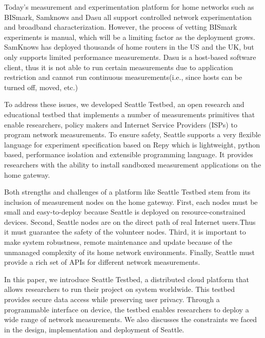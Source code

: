 \documentclass[11pt, oneside]{article}   	%
\begin{document}
Today's measurement and experimentation platform for home networks such as BISmark, Samknows and Dasu all support controlled network experimentation and broadband characterization. However, the process of vetting BISmark experiments is manual, which will be a limiting factor as the deployment grows. SamKnows has deployed thousands of home routers in the US and the UK, but only supports limited performance measurements. Dasu is a host-based software client, thus it is not able to run certain measurements due to application restriction and cannot run continuous measurements(i.e., since hosts can be turned off, moved, etc.)
 
To address these issues, we developed Seattle Testbed, an open research and educational testbed that implements a number of measurements primitives that enable researchers, policy makers and Internet Service Providers (ISPs) to program network measurements. To ensure safety, Seattle supports a very flexible language for experiment specification based on Repy which is lightweight, python based, performance isolation and extensible programming language. It provides researchers with the ability to install sandboxed measurement applications on the home gateway. 

Both strengths and challenges of a platform like Seattle Testbed stem from its inclusion of measurement nodes on the home gateway. First, each nodes must be small and easy-to-deploy because Seattle is deployed on resource-constrained devices. Second, Seattle nodes are on the direct path of real Internet users.Thus it must guarantee the safety of the volunteer nodes. Third, it is important to make system robustness, remote maintenance and update because of the unmanaged complexity of its home network environments. Finally, Seattle must provide a rich set of APIs for different network measurements.

In this paper, we introduce Seattle Testbed, a distributed cloud platform that allows researchers to run their project on system worldwide. This testbed provides secure data access while preserving user privacy. Through a programmable interface on device, the testbed enables researchers to deploy a wide range of network measurements. We also discusses the constraints we faced in the design, implementation and deployment of Seattle.
\end{document}
